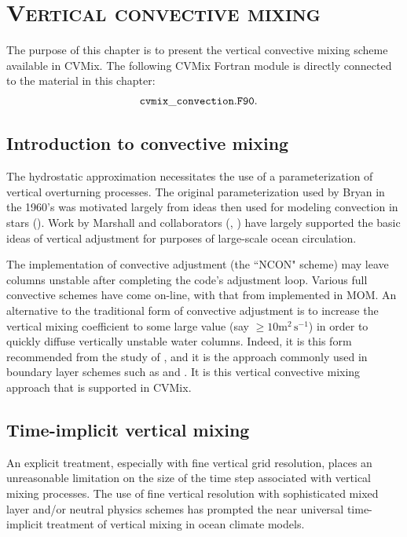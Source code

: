 \chapter{\scshape Vertical convective mixing}
\label{chapter:cvmix_convection}

\minitoc
\vspace{.5cm}

The purpose of this chapter is to present the vertical convective
mixing scheme available in CVMix.  The following CVMix Fortran module
is directly connected to the material in this chapter:
\begin{align*} 
 &  {\tt cvmix\_convection.F90}.
\end{align*}


\section{Introduction to convective mixing}
\label{section:intro}

The hydrostatic approximation necessitates the use of a
parameterization of vertical overturning processes.  The original
parameterization used by Bryan in the 1960's was motivated largely
from ideas then used for modeling convection in stars
(\cite{Bryan1969}).  Work by Marshall and collaborators
(\cite{KlingerConvection}, \cite{MITmodel}) have largely supported the
basic ideas of vertical adjustment for purposes of large-scale ocean
circulation.

The \cite{CoxModel} implementation of convective adjustment (the
``NCON" scheme) may leave columns unstable after completing the code's
adjustment loop.  Various full convective schemes have come on-line,
with that from \cite{Rahmstorf1993} implemented in MOM.  An
alternative to the traditional form of convective adjustment is to
increase the vertical mixing coefficient to some large value (say $\ge
10 \mbox{m}^{2} \, \mbox{s}^{-1}$) in order to quickly diffuse
vertically unstable water columns.  Indeed, it is this form
recommended from the study of \cite{KlingerConvection}, and it is the
approach commonly used in boundary layer schemes such as \cite{PPvmix}
and \cite{LargeKPP}.  It is this vertical convective mixing approach
that is supported in CVMix.  


\section{Time-implicit vertical mixing}
\label{section:time-implicit-vmix}

An explicit treatment, especially with fine vertical grid resolution,
places an unreasonable limitation on the size of the time step
associated with vertical mixing processes.  The use of fine vertical
resolution with sophisticated mixed layer and/or neutral physics
schemes has prompted the near universal time-implicit treatment of
vertical mixing in ocean climate models.

